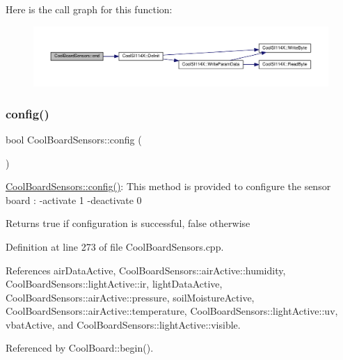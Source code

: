 Here is the call graph for this function\+:
\nopagebreak
\begin{figure}[H]
\begin{center}
\leavevmode
\includegraphics[width=350pt]{de/d46/class_cool_board_sensors_a4902b69f6e628bd6557193758fdd2bae_cgraph}
\end{center}
\end{figure}
\mbox{\label{class_cool_board_sensors_a9a218895c5423375c33c08f2c56fb23a}} 
\subsubsection{\texorpdfstring{config()}{config()}}
{\footnotesize\ttfamily bool Cool\+Board\+Sensors\+::config (\begin{DoxyParamCaption}{ }\end{DoxyParamCaption})}

\hyperlink{class_cool_board_sensors_a9a218895c5423375c33c08f2c56fb23a}{Cool\+Board\+Sensors\+::config()}\+: This method is provided to configure the sensor board \+: -\/activate 1 -\/deactivate 0

\begin{DoxyReturn}{Returns}
true if configuration is successful, false otherwise 
\end{DoxyReturn}


Definition at line 273 of file Cool\+Board\+Sensors.\+cpp.



References air\+Data\+Active, Cool\+Board\+Sensors\+::air\+Active\+::humidity, Cool\+Board\+Sensors\+::light\+Active\+::ir, light\+Data\+Active, Cool\+Board\+Sensors\+::air\+Active\+::pressure, soil\+Moisture\+Active, Cool\+Board\+Sensors\+::air\+Active\+::temperature, Cool\+Board\+Sensors\+::light\+Active\+::uv, vbat\+Active, and Cool\+Board\+Sensors\+::light\+Active\+::visible.



Referenced by Cool\+Board\+::begin().

